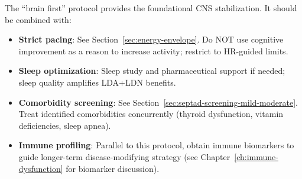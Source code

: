 \begin{protocol}
The ``brain first'' protocol provides the foundational CNS stabilization. It should be combined with:
\begin{itemize}
    \item \textbf{Strict pacing}: See Section~\ref{sec:energy-envelope}. Do NOT use cognitive improvement as a reason to increase activity; restrict to HR-guided limits.
    \item \textbf{Sleep optimization}: Sleep study and pharmaceutical support if needed; sleep quality amplifies LDA+LDN benefits.
    \item \textbf{Comorbidity screening}: See Section~\ref{sec:septad-screening-mild-moderate}. Treat identified comorbidities concurrently (thyroid dysfunction, vitamin deficiencies, sleep apnea).
    \item \textbf{Immune profiling}: Parallel to this protocol, obtain immune biomarkers to guide longer-term disease-modifying strategy (see Chapter~\ref{ch:immune-dysfunction} for biomarker discussion).
\end{itemize}

\end{protocol}

